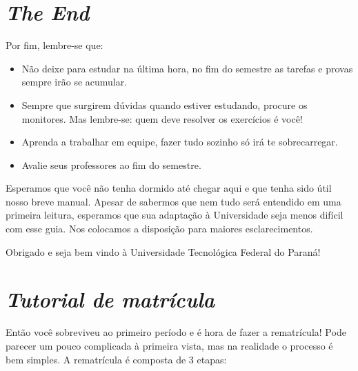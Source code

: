 \documentclass[a4paper,12pt,openany]{article}
\begin{document}
\newpage
\section{\textit{The End}}

Por fim, lembre-se que:

\begin{itemize}
\item Não deixe para estudar na última hora, no fim do semestre as tarefas e provas sempre irão se acumular.
\item Sempre que surgirem dúvidas quando estiver estudando, procure os monitores. Mas lembre-se: quem deve resolver os exercícios é você!
\item Aprenda a trabalhar em equipe, fazer tudo sozinho só irá te sobrecarregar.
\item Avalie seus professores ao fim do semestre.
\end{itemize}



Esperamos que você não tenha dormido até chegar aqui e que tenha sido útil nosso breve manual. Apesar de sabermos que nem tudo será entendido em uma primeira leitura, esperamos que sua adaptação à Universidade seja menos difícil com esse guia. Nos colocamos a disposição para maiores esclarecimentos.

Obrigado e seja bem vindo à Universidade Tecnológica Federal do Paraná!


\newpage
\appendix
\section{\textit{Tutorial de matrícula}} \label{app:tutorial}

Então você sobreviveu ao primeiro período e é hora de fazer a rematrícula! Pode parecer um pouco complicada à primeira vista, mas na realidade o processo é bem simples. A rematrícula é composta de 3 etapas:
\end{document}
